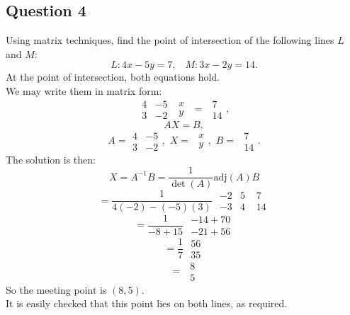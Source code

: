 \documentclass[12pt]{article}
\newcommand{\adj}{\textrm{adj}}
\begin{document}
\subsection*{Question 4}
Using matrix techniques, find the point of intersection of the following lines $L$ and $M$:
\[ L: 4x - 5y = 7, \hspace{10pt} M: 3x - 2y = 14.\]
At the point of intersection, both equations hold.\\
We may write them in matrix form:
\[  \begin{array}{|cc|}4&-5\\3&-2\end{array}\hspace{4pt}\begin{array}{|c|}x\\y\end{array} \hspace{4pt} = \hspace{4pt}\begin{array}{|c|}7\\14\end{array},\]
\[ AX = B,\]
\[ A =  \begin{array}{|cc|}4&-5\\3&-2\end{array}, \hspace{4pt}X = \hspace{4pt}\begin{array}{|c|}x\\y\end{array}, \hspace{4pt}B = \hspace{4pt}\begin{array}{|c|}7\\14\end{array}.\]
The solution is then:
\[ X = A^{-1}B = \frac{1}{\det(A)}\adj(A) B \]
\[ = \frac{1}{4(-2) - (-5)(3)}\hspace{4pt} \begin{array}{|cc|}-2&5\\-3&4\end{array} \hspace{4pt}\begin{array}{|c|}7\\14\end{array}\]
\[ = \frac{1}{-8 + 15} \hspace{4pt}\begin{array}{|c|}-14 + 70\\-21 + 56\end{array}\]
\[ = \frac{1}{7} \hspace{4pt}\begin{array}{|c|}56\\35\end{array}\]
\[ = \hspace{4pt}\begin{array}{|c|}8\\5\end{array}\]
So the meeting point is $(8, 5)$.\\
It is easily checked that this point lies on both lines, as required.
\end{document}
